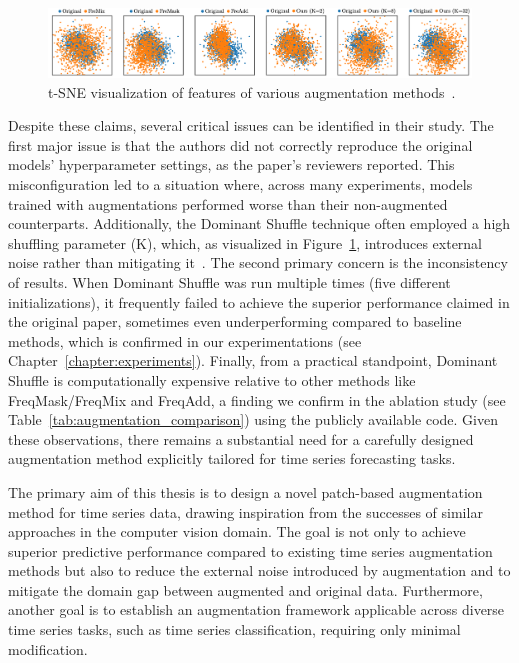 \begin{figure}[h!]
    \centering
\includegraphics[page=1, width=1.0\textwidth]{./images/ood.png}
    \caption{t-SNE visualization of features of various augmentation methods~\cite{zhao2024dominantshufflesimplepowerful}.}
    \label{fig:ood}
\end{figure}

Despite these claims, several critical issues can be identified in their study. The first major issue is that the authors did not correctly reproduce the original models' hyperparameter settings, as the paper's reviewers reported. This misconfiguration led to a situation where, across many experiments, models trained with augmentations performed worse than their non-augmented counterparts. Additionally, the Dominant Shuffle technique often employed a high shuffling parameter (K), which, as visualized in Figure~\ref{fig:ood}, introduces external noise rather than mitigating it~\cite{zhao2024dominantshufflesimplepowerful}. The second primary concern is the inconsistency of results. When Dominant Shuffle was run multiple times (five different initializations), it frequently failed to achieve the superior performance claimed in the original paper, sometimes even underperforming compared to baseline methods, which is confirmed in our experimentations (see Chapter~\ref{chapter:experiments}). Finally, from a practical standpoint, Dominant Shuffle is computationally expensive relative to other methods like FreqMask/FreqMix and FreqAdd, a finding we confirm in the ablation study (see Table~\ref{tab:augmentation_comparison}) using the publicly available code. Given these observations, there remains a substantial need for a carefully designed augmentation method explicitly tailored for time series forecasting tasks.


The primary aim of this thesis is to design a novel patch-based augmentation method for time series data, drawing inspiration from the successes of similar approaches in the computer vision domain. The goal is not only to achieve superior predictive performance compared to existing time series augmentation methods but also to reduce the external noise introduced by augmentation and to mitigate the domain gap between augmented and original data.  Furthermore, another goal is to establish an augmentation framework applicable across diverse time series tasks, such as time series classification, requiring only minimal modification.

